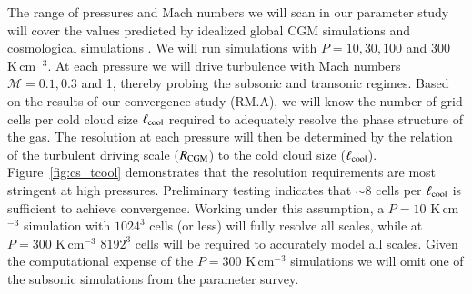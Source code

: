 \documentclass[11pt,letterpaper,english]{article}
\begin{document}
The range of pressures and Mach numbers we will scan in our parameter study will cover the values predicted by idealized global CGM simulations \cite{Fielding17} and cosmological simulations \cite{Nelson+16}. We will run simulations with $P = 10, 30, 100$ and 300 K\,cm$^{-3}$.  At each pressure we will drive turbulence with Mach numbers $\mathcal{M} = 0.1, 0.3$ and 1, thereby probing the subsonic and transonic regimes. 
Based on the results of our convergence study (RM.A), we will know the number of grid cells per cold cloud size $\ell_{\rm cool}$ required to adequately resolve the phase structure of the gas.
The resolution at each pressure will then be determined by the relation of the turbulent driving scale ($R_{\rm CGM}$) to the cold cloud size ($\ell_{\rm cool}$).
Figure~\ref{fig:cs_tcool} demonstrates that the resolution requirements are most stringent at high pressures. Preliminary testing indicates that ${\sim}8 $ cells per $\ell_{\rm cool}$ is sufficient to achieve convergence. Working under this assumption, a $P=10$ K\,cm$^{-3}$ simulation with $1024^3$ cells (or less) will fully resolve all scales, while at $P=300$ K\,cm$^{-3}$ $8192^3$ cells will be required to accurately model all scales. Given the computational expense of the $P=300$ K\,cm$^{-3}$ simulations we will omit one of the subsonic simulations from the parameter survey.



\end{document}

